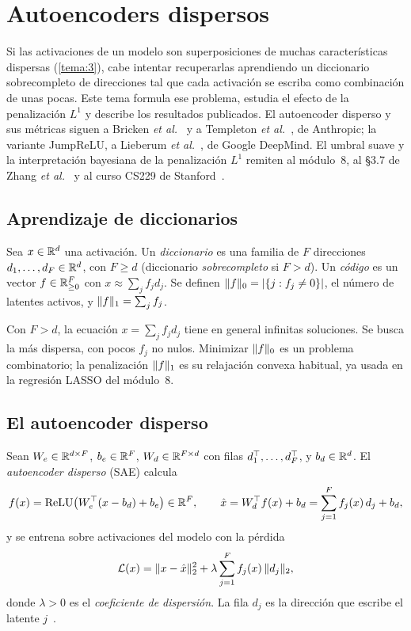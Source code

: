 \chapter{Autoencoders dispersos}
\label{tema:4}

Si las activaciones de un modelo son superposiciones de muchas características dispersas (\cref{tema:3}), cabe intentar recuperarlas aprendiendo un diccionario sobrecompleto de direcciones tal que cada activación se escriba como combinación de unas pocas. Este tema formula ese problema, estudia el efecto de la penalización $L^{1}$ y describe los resultados publicados. El autoencoder disperso y sus métricas siguen a Bricken \emph{et al.}~\cite{bricken} y a Templeton \emph{et al.}~\cite{templeton}, de Anthropic; la variante JumpReLU, a Lieberum \emph{et al.}~\cite{gemmascope}, de Google DeepMind. El umbral suave y la interpretación bayesiana de la penalización $L^{1}$ remiten al módulo~8, al §3.7 de Zhang \emph{et al.}~\cite{d2l} y al curso CS229 de Stanford~\cite{cs229ps2}.

\section{Aprendizaje de diccionarios}

\begin{definicion}\label{def:diccionario}
Sea $x\in\mathbb{R}^{d}$ una activación. Un \emph{diccionario} es una familia de $F$ direcciones $d_1,\dots,d_F\in\mathbb{R}^{d}$, con $F\ge d$ (diccionario \emph{sobrecompleto} si $F>d$). Un \emph{código} es un vector $f\in\mathbb{R}^{F}_{\ge 0}$ con $x\approx\sum_jf_jd_j$. Se definen $\lVert f\rVert_0=\lvert\{j:f_j\neq 0\}\rvert$, el número de latentes activos, y $\lVert f\rVert_1=\sum_jf_j$.
\end{definicion}

Con $F>d$, la ecuación $x=\sum_jf_jd_j$ tiene en general infinitas soluciones. Se busca la más dispersa, con pocos $f_j$ no nulos. Minimizar $\lVert f\rVert_0$ es un problema combinatorio; la penalización $\lVert f\rVert_1$ es su relajación convexa habitual, ya usada en la regresión LASSO del módulo~8.

\section{El autoencoder disperso}

\begin{definicion}\label{def:sae}
Sean $W_e\in\mathbb{R}^{d\times F}$, $b_e\in\mathbb{R}^{F}$, $W_d\in\mathbb{R}^{F\times d}$ con filas $d_1^{\top},\dots,d_F^{\top}$, y $b_d\in\mathbb{R}^{d}$. El \emph{autoencoder disperso} (SAE) calcula
\[
f(x)=\operatorname{ReLU}\bigl(W_e^{\top}(x-b_d)+b_e\bigr)\in\mathbb{R}^{F},\qquad \hat x=W_d^{\top} f(x)+b_d=\sum_{j=1}^{F}f_j(x)\,d_j+b_d,
\]
y se entrena sobre activaciones del modelo con la pérdida
\[
\mathcal{L}(x)=\lVert x-\hat x\rVert_2^{2}+\lambda\sum_{j=1}^{F}f_j(x)\,\lVert d_j\rVert_2,
\]
donde $\lambda>0$ es el \emph{coeficiente de dispersión}. La fila $d_j$ es la dirección que escribe el latente $j$~\cite{bricken,templeton}.
\end{definicion}


